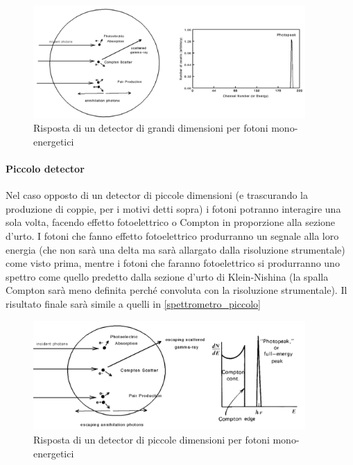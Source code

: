  \begin{figure}[h]
 	\centering
 	\includegraphics[width=28em]{spettrometro_grosso}
 	\caption{\label{fig:spettrometro_grsso}Risposta di un detector di grandi dimensioni per fotoni mono-energetici}
 \end{figure}

 \paragraph{Piccolo detector}Nel caso opposto di un detector di piccole dimensioni (e trascurando la produzione di coppie, per i motivi detti sopra) i fotoni potranno interagire una sola volta, facendo effetto fotoelettrico o Compton in proporzione alla sezione d'urto. I fotoni che fanno effetto fotoelettrico produrranno un segnale alla loro energia (che non sarà una delta ma sarà allargato dalla risoluzione strumentale) come visto prima, mentre i fotoni che faranno fotoelettrico si produrranno uno spettro come quello predetto dalla sezione d'urto di Klein-Nishina (la spalla Compton sarà meno definita perché convoluta con la risoluzione strumentale). Il risultato finale sarà simile a quelli in \autoref{spettrometro_piccolo}
 
  \begin{figure}[h]
 	\centering
 	\includegraphics[width=28em]{spettrometro_piccolo}
 	\caption{\label{fig:spettrometro_piccolo}Risposta di un detector di piccole dimensioni per fotoni mono-energetici}
 \end{figure}
 
